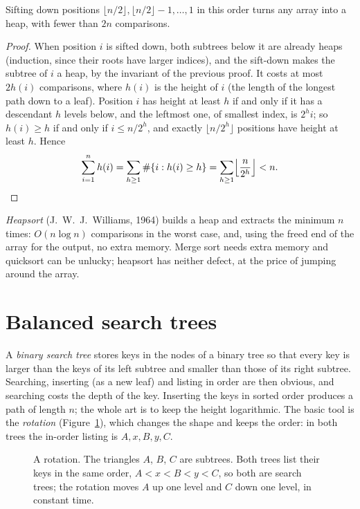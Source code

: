 \begin{proposition}[Floyd, 1964]\label{prop:buildheap}
Sifting down positions $\lfloor n/2\rfloor,\lfloor n/2\rfloor-1,\dots,1$ in this order turns any array into a heap, with fewer than $2n$ comparisons.
\end{proposition}
\begin{proof}
When position $i$ is sifted down, both subtrees below it are already heaps (induction, since their roots have larger indices), and the
sift-down makes the subtree of $i$ a heap, by the invariant of the previous proof. It costs at most $2h(i)$ comparisons, where $h(i)$ is the height of
$i$ (the length of the longest path down to a leaf). Position $i$ has height at least $h$ if and only if it has a descendant $h$ levels below, and the
leftmost one, of smallest index, is $2^hi$; so $h(i)\ge h$ if and only if $i\le n/2^h$, and exactly $\lfloor n/2^h\rfloor$ positions have height at least $h$. Hence
\[
\sum_{i=1}^nh(i)=\sum_{h\ge1}\#\{i:h(i)\ge h\}=\sum_{h\ge1}\Bigl\lfloor\frac n{2^h}\Bigr\rfloor<n.
\]
\end{proof}

\emph{Heapsort} (J.~W.~J.~Williams, 1964) builds a heap and extracts the minimum $n$ times: $O(n\log n)$ comparisons in the worst case, and, using the
freed end of the array for the output, no extra memory. Merge sort needs extra memory and quicksort can be unlucky; heapsort has neither defect, at the
price of jumping around the array.

\section{Balanced search trees}\label{sec:avl}

A \emph{binary search tree} stores keys in the nodes of a binary tree so that every key is larger than the keys of its left subtree and smaller than those of its
right subtree. Searching, inserting (as a new leaf) and listing in order are then obvious, and searching costs the depth of the key. Inserting the keys in
sorted order produces a path of length $n$; the whole art is to keep the height logarithmic. The basic tool is the \emph{rotation} (Figure~\ref{fig:rotation}), which
changes the shape and keeps the order: in both trees the in-order listing is $A,x,B,y,C$.

\begin{figure}[ht]
\centering
{}
\caption{A rotation. The triangles $A$, $B$, $C$ are subtrees. Both trees list their keys in the same order, $A<x<B<y<C$, so both are search trees; the
rotation moves $A$ up one level and $C$ down one level, in constant time.}
\label{fig:rotation}
\end{figure}

